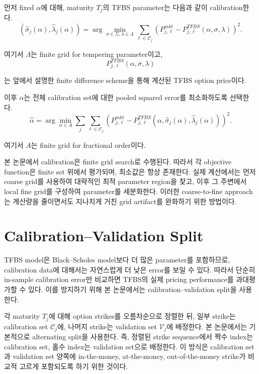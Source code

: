 \documentclass[11pt,a4paper]{report}
\begin{document}
먼저 fixed $\alpha$에 대해, maturity $T_j$의 TFBS parameter는 다음과 같이 calibration한다.
\[
(\widehat{\sigma}_j(\alpha),\widehat{\lambda}_j(\alpha))
=
\arg\min_{\sigma\in\Sigma,\lambda\in\Lambda}
\sum_{\ell\in\mathcal{C}_j}
\left(
P_{j,\ell}^{mkt}
-
P_{j,\ell}^{TFBS}(\alpha,\sigma,\lambda)
\right)^2.
\]

여기서 $\Lambda$는 finite grid for tempering parameter이고,
\[
P_{j,\ell}^{TFBS}(\alpha,\sigma,\lambda)
\]

는 앞에서 설명한 finite difference scheme을 통해 계산된 TFBS option price이다.

이후 $\alpha$는 전체 calibration set에 대한 pooled squared error를 최소화하도록 선택한다.
\[
\widehat{\alpha}
=
\arg\min_{\alpha\in A}
\sum_j
\sum_{\ell\in\mathcal{C}_j}
\left(
P_{j,\ell}^{mkt}
-
P_{j,\ell}^{TFBS}
(\alpha,\widehat{\sigma}_j(\alpha),\widehat{\lambda}_j(\alpha))
\right)^2.
\]

여기서 $A$는 finite grid for fractional order이다.

본 논문에서 calibration은 finite grid search로 수행된다. 따라서 각 objective function은 finite set 위에서 평가되며, 최소값은 항상 존재한다. 실제 계산에서는 먼저 coarse grid를 사용하여 대략적인 최적 parameter region을 찾고, 이후 그 주변에서 local fine grid를 구성하여 parameter를 세분화한다. 이러한 coarse-to-fine approach는 계산량을 줄이면서도 지나치게 거친 grid artifact를 완화하기 위한 방법이다.

\section{Calibration--Validation Split}

TFBS model은 Black--Scholes model보다 더 많은 parameter를 포함하므로, calibration data에 대해서는 자연스럽게 더 낮은 error를 보일 수 있다. 따라서 단순히 in-sample calibration error만 비교하면 TFBS의 실제 pricing performance를 과대평가할 수 있다. 이를 방지하기 위해 본 논문에서는 calibration--validation split을 사용한다.

각 maturity $T_j$에 대해 option strikes를 오름차순으로 정렬한 뒤, 일부 strike는 calibration set $\mathcal{C}_j$에, 나머지 strike는 validation set $\mathcal{V}_j$에 배정한다. 본 논문에서는 기본적으로 alternating split을 사용한다. 즉, 정렬된 strike sequence에서 짝수 index는 calibration set, 홀수 index는 validation set으로 배정한다. 이 방식은 calibration set과 validation set 양쪽에 in-the-money, at-the-money, out-of-the-money strike가 비교적 고르게 포함되도록 하기 위한 것이다.
\end{document}
